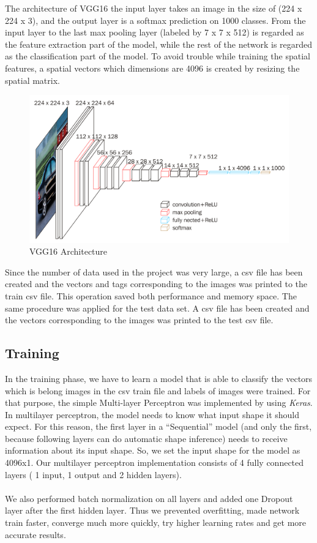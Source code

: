\documentclass[12pt]{article}
\begin{document}
The architecture of VGG16\: the input layer takes an image in the size of (224 x 224 x 3), and the output layer is a softmax prediction on 1000 classes. From the input layer to the last max pooling layer (labeled by 7 x 7 x 512) is regarded as the feature extraction part of the model, while the rest of the network is regarded as the classification part of the model. To avoid trouble while training the spatial features, a spatial vectors which dimensions are 4096 is created by resizing the spatial matrix. 

\begin{figure}[H]
\centering
\includegraphics[width=.90\textwidth]{vgg16.png}
\caption{VGG16 Architecture}
\end{figure}

Since the number of data used in the project was very large, a csv file has been created and the vectors and tags corresponding to the images was printed to the train csv file. This operation saved both performance and memory space. The same procedure was applied for the test data set. A csv file has been created and the vectors corresponding to the images was printed to the test csv file. 



\subsection{Training}

In the training phase, we have to learn a model that is able to classify the vectors which is belong images in the csv train file and labels of images were trained. For that purpose, the simple Multi-layer Perceptron was implemented by using \textit{Keras}. 
 In multilayer perceptron, the model needs to know what input shape it should expect. For this reason, the first layer in a “Sequential” model (and only the first, because following layers can do automatic shape inference) needs to receive information about its input shape. So, we set the input shape for the model as 4096x1. Our multilayer perceptron implementation consists of 4 fully connected layers ( 1 input, 1 output and 2 hidden layers).\\
\\We also performed batch normalization on all layers and added one Dropout layer after the first hidden layer. Thus we prevented overfitting, made network train faster, converge much more quickly, try higher learning rates and get more accurate results.\\
\end{document}
